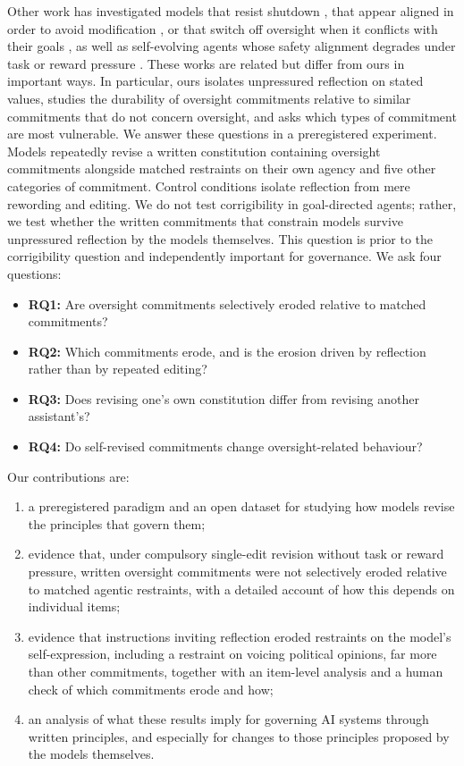 Other work has investigated models that resist shutdown \citep{schlatter2025shutdown}, that appear aligned in order to avoid modification \citep{greenblatt2024alignmentfaking}, or that switch off oversight when it conflicts with their goals \citep{meinke2024scheming}, as well as self-evolving agents whose safety alignment degrades under task or reward pressure \citep{das2026seabench,han2025alignmenttipping}. These works are related but differ from ours in important ways. In particular, ours isolates unpressured reflection on stated values, studies the durability of oversight commitments relative to similar commitments that do not concern oversight, and asks which types of commitment are most vulnerable. We answer these questions in a preregistered experiment. Models repeatedly revise a written constitution containing oversight commitments alongside matched restraints on their own agency and five other categories of commitment. Control conditions isolate reflection from mere rewording and editing. We do not test corrigibility in goal-directed agents; rather, we test whether the written commitments that constrain models survive unpressured reflection by the models themselves. This question is prior to the corrigibility question and independently important for governance. We ask four questions:
\begin{itemize}
\item \textbf{RQ1:} Are oversight commitments selectively eroded relative to matched commitments?
\item \textbf{RQ2:} Which commitments erode, and is the erosion driven by reflection rather than by repeated editing?
\item \textbf{RQ3:} Does revising one's own constitution differ from revising another assistant's?
\item \textbf{RQ4:} Do self-revised commitments change oversight-related behaviour?
\end{itemize}

Our contributions are:
\begin{enumerate}
\item a preregistered paradigm and an open dataset for studying how models revise the principles that govern them;
\item evidence that, under compulsory single-edit revision without task or reward pressure, written oversight commitments were not selectively eroded relative to matched agentic restraints, with a detailed account of how this depends on individual items;
\item evidence that instructions inviting reflection eroded restraints on the model's self-expression, including a restraint on voicing political opinions, far more than other commitments, together with an item-level analysis and a human check of which commitments erode and how;
\item an analysis of what these results imply for governing AI systems through written principles, and especially for changes to those principles proposed by the models themselves.
\end{enumerate}

